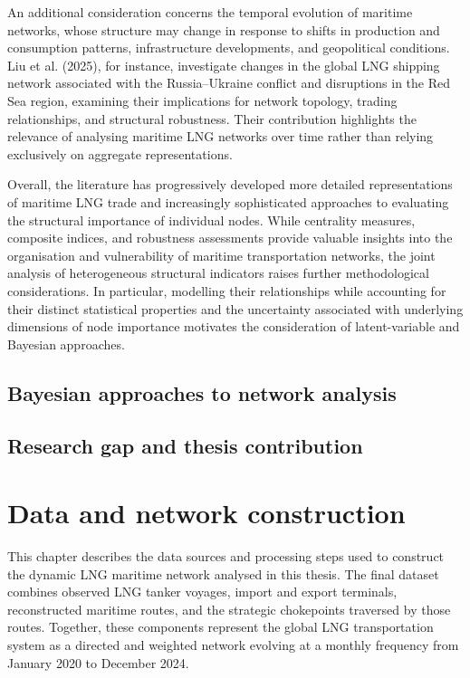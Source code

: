 \documentclass[pdftex,12pt,openright,a4paper,oneside]{book}
\begin{document}
An additional consideration concerns the temporal evolution of maritime networks, whose structure may change in response to shifts in production and consumption patterns, infrastructure developments, and geopolitical conditions. Liu et al. (2025), for instance, investigate changes in the global LNG shipping network associated with the Russia–Ukraine conflict and disruptions in the Red Sea region, examining their implications for network topology, trading relationships, and structural robustness. Their contribution highlights the relevance of analysing maritime LNG networks over time rather than relying exclusively on aggregate representations.

Overall, the literature has progressively developed more detailed representations of maritime LNG trade and increasingly sophisticated approaches to evaluating the structural importance of individual nodes. While centrality measures, composite indices, and robustness assessments provide valuable insights into the organisation and vulnerability of maritime transportation networks, the joint analysis of heterogeneous structural indicators raises further methodological considerations. In particular, modelling their relationships while accounting for their distinct statistical properties and the uncertainty associated with underlying dimensions of node importance motivates the consideration of latent-variable and Bayesian approaches.

\section{Bayesian approaches to network analysis}

\section{Research gap and thesis contribution}

% 
%
%
\chapter{Data and network construction}
\label{chap:data_network}

This chapter describes the data sources and processing steps used to construct the dynamic LNG maritime network analysed in this thesis. The final dataset combines observed LNG tanker voyages, import and export terminals, reconstructed maritime routes, and the strategic chokepoints traversed by those routes. Together, these components represent the global LNG transportation system as a directed and weighted network evolving at a monthly frequency from January 2020 to December 2024. 
\end{document}
